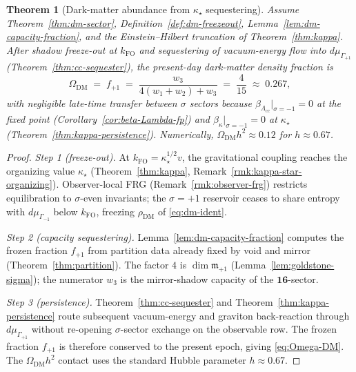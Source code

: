 \documentclass[aps,prd,onecolumn,amsmath,amssymb,nofootinbib,11pt]{revtex4-2}
\numberwithin{equation}{section}
\theoremstyle{plain}
\newtheorem{theorem}{Theorem}[section]
\theoremstyle{definition}
\theoremstyle{remark}
\begin{document}
\begin{theorem}[Dark-matter abundance from $\kappa_\star$ sequestering]
\label{thm:dm-abundance}
Assume Theorem~\ref{thm:dm-sector}, Definition~\ref{def:dm-freezeout},
Lemma~\ref{lem:dm-capacity-fraction}, and the Einstein--Hilbert truncation of
Theorem~\ref{thm:kappa}. After shadow freeze-out at $k_{\mathrm{FO}}$ and
sequestering of vacuum-energy flow into $d\mu_{\Gamma_{+1}}$
(Theorem~\ref{thm:cc-sequester}), the present-day dark-matter density fraction
is
\begin{equation}\label{eq:Omega-DM}
  \Omega_{\mathrm{DM}}
  \;=\;
  f_{+1}
  \;=\;
  \frac{w_3}{4(w_1+w_2)+w_3}
  \;=\;
  \frac{4}{15}
  \;\approx\;
  0.267,
\end{equation}
with negligible late-time transfer between $\sigma$ sectors because
$\beta_{\Lambda_{\mathrm{cc}}}|_{\sigma=-1}=0$ at the fixed point
(Corollary~\ref{cor:beta-Lambda-fp}) and $\beta_\kappa|_{\sigma=-1}=0$ at
$\kappa_\star$ (Theorem~\ref{thm:kappa-persistence}). Numerically,
$\Omega_{\mathrm{DM}}h^2\approx 0.12$ for $h\approx 0.67$.
\end{theorem}

\begin{proof}
\emph{Step 1 (freeze-out).}
At $k_{\mathrm{FO}}=\kappa_\star^{1/2}v$, the gravitational coupling reaches
the organizing value $\kappa_\star$ (Theorem~\ref{thm:kappa},
Remark~\ref{rmk:kappa-star-organizing}). Observer-local FRG
(Remark~\ref{rmk:observer-frg}) restricts equilibration to
$\sigma$-even invariants; the $\sigma=+1$ reservoir ceases to share entropy
with $d\mu_{\Gamma_{-1}}$ below $k_{\mathrm{FO}}$, freezing
$\rho_{\mathrm{DM}}$ of \eqref{eq:dm-ident}.

\emph{Step 2 (capacity sequestering).}
Lemma~\ref{lem:dm-capacity-fraction} computes the frozen fraction $f_{+1}$
from partition data already fixed by void and mirror
(Theorem~\ref{thm:partition}). The factor $4$ is $\dim\mathfrak{m}_{+1}$
(Lemma~\ref{lem:goldstone-sigma}); the numerator $w_3$ is the mirror-shadow
capacity of the $\mathbf{16}$-sector.

\emph{Step 3 (persistence).}
Theorem~\ref{thm:cc-sequester} and Theorem~\ref{thm:kappa-persistence} route
subsequent vacuum-energy and graviton back-reaction through
$d\mu_{\Gamma_{+1}}$ without re-opening $\sigma$-sector exchange on the
observable row. The frozen fraction $f_{+1}$ is therefore conserved to the
present epoch, giving \eqref{eq:Omega-DM}. The $\Omega_{\mathrm{DM}}h^2$
contact uses the standard Hubble parameter $h\approx 0.67$.
\end{proof}
\end{document}
